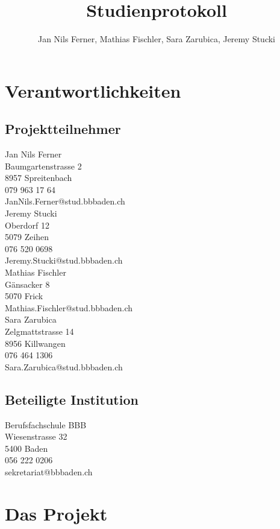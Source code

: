\documentclass[11pt]{article}
\title{Studienprotokoll}
\author{Jan Nils Ferner, Mathias Fischler, Sara Zarubica, Jeremy Stucki}
\begin{document}
	
	\maketitle
	\newpage
	
	\tableofcontents
	\newpage
		
	\section{Verantwortlichkeiten}
	\subsection{Projektteilnehmer}
	Jan Nils Ferner \\
	Baumgartenstrasse 2 \\
	8957 Spreitenbach \\
	079 963 17 64 \\
	JanNils.Ferner@stud.bbbaden.ch\\
	
	Jeremy Stucki \\
	Oberdorf 12 \\
	5079 Zeihen \\	
	076 520 0698 \\
	Jeremy.Stucki@stud.bbbaden.ch\\
	
	Mathias Fischler \\
	Gänsacker 8 \\
	5070 Frick \\
	Mathias.Fischler@stud.bbbaden.ch\\
	
	Sara Zarubica \\
	Zelgmattstrasse 14 \\
	8956 Killwangen \\
	076 464 1306 \\
	Sara.Zarubica@stud.bbbaden.ch\\
	
	\subsection{Beteiligte Institution}
	Berufsfachschule BBB \\
	Wiesenstrasse 32 \\
	5400 Baden \\
	056 222 0206 \\
	sekretariat@bbbaden.ch\\
	\newpage
	
	\section{Das Projekt}
\end{document}
